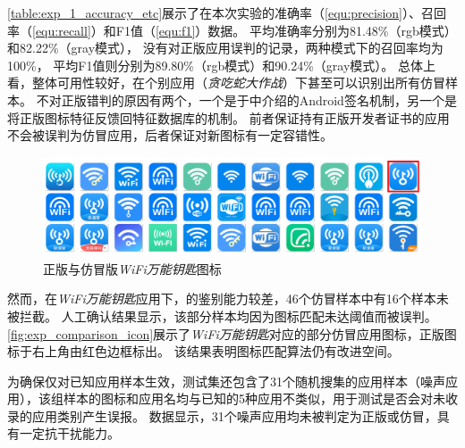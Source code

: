 \autoref{table:exp_1_accuracy_etc}展示了\mytool 在本次实验的准确率（\autoref{equ:precision}）、召回率（\autoref{equ:recall}）和F1值（\autoref{equ:f1}）数据。
\mytool 平均准确率分别为81.48\%（rgb模式）和82.22\%（gray模式），
没有对正版应用误判的记录，两种模式下的召回率均为100\%，
平均F1值则分别为89.80\%（rgb模式）和90.24\%（gray模式）。
总体上看，\mytool 整体可用性较好，在个别应用（\textit{贪吃蛇大作战}）下甚至可以识别出所有仿冒样本。
\mytool 不对正版错判的原因有两个，一个是于中介绍的Android签名机制，另一个是\componentB 将正版图标特征反馈回特征数据库的机制。
前者保证持有正版开发者证书的应用不会被误判为仿冒应用，后者保证\mytool 对新图标有一定容错性。

\begin{figure}[htbp]
    \centering
    \includegraphics[width=\textwidth]{./Figures/edwin-exp-comparison}
    \caption{正版与仿冒版\textit{WiFi万能钥匙}图标}
    \label{fig:exp_comparison_icon}
    \vspace{-3mm}
\end{figure}

然而，在\textit{WiFi万能钥匙}应用下，\mytool 的鉴别能力较差，46个仿冒样本中有16个样本未被拦截。
人工确认结果显示，该部分样本均因为图标匹配未达阈值而被误判。
\autoref{fig:exp_comparison_icon}展示了\textit{WiFi万能钥匙}对应的部分仿冒应用图标，正版图标于右上角由红色边框标出。
该结果表明图标匹配算法仍有改进空间。

为确保\mytool 仅对已知应用样本生效，测试集还包含了31个随机搜集的应用样本（噪声应用），该组样本的图标和应用名均与已知的5种应用不类似，用于测试\mytool 是否会对未收录的应用类别产生误报。
数据显示，31个噪声应用均未被判定为正版或仿冒，\mytool 具有一定抗干扰能力。

